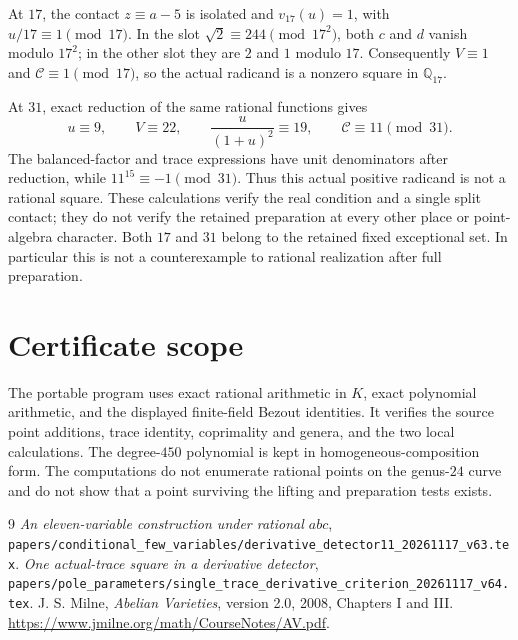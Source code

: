 \documentclass[11pt,a4paper]{article}
\newcommand{\Q}{\mathbb Q}
\begin{document}
At $17$, the contact $z\equiv a-5$ is isolated and
$v_{17}(u)=1$, with $u/17\equiv1\pmod{17}$. In the slot
$\sqrt2\equiv244\pmod{17^2}$, both $c$ and $d$ vanish modulo
$17^2$; in the other slot they are $2$ and $1$ modulo $17$.
Consequently $V\equiv1$ and $\mathcal C\equiv1\pmod{17}$,
so the actual radicand is a nonzero square in $\Q_{17}$.

At $31$, exact reduction of the same rational functions gives
\[
       u\equiv9,\qquad V\equiv22,\qquad
       \frac{u}{(1+u)^2}\equiv19,\qquad
                       \mathcal C\equiv11\pmod{31}.
\]
The balanced-factor and trace expressions have unit denominators
after reduction, while $11^{15}\equiv-1\pmod{31}$.
Thus this actual positive radicand is not a rational square. These
calculations verify the real condition and a single split contact;
they do not verify the retained preparation at every other place or
point-algebra character. Both $17$ and $31$ belong to the retained
fixed exceptional set. In particular this is not a counterexample
to rational realization after full preparation.

\section{Certificate scope}

The portable program uses exact rational arithmetic in $K$, exact
polynomial arithmetic, and the displayed finite-field Bezout
identities. It verifies the source point additions, trace identity,
coprimality and genera, and the two local calculations. The degree-$450$
polynomial is kept in homogeneous-composition form. The computations
do not enumerate rational points on the genus-$24$ curve and do not
show that a point surviving the lifting and preparation tests exists.

\begin{thebibliography}{9}
\emph{An eleven-variable construction under rational $abc$},
\nolinkurl{papers/conditional_few_variables/derivative_detector11_20261117_v63.tex}.
\emph{One actual-trace square in a derivative detector},
\nolinkurl{papers/pole_parameters/single_trace_derivative_criterion_20261117_v64.tex}.
J. S. Milne, \emph{Abelian Varieties}, version 2.0,
2008, Chapters I and III. \url{https://www.jmilne.org/math/CourseNotes/AV.pdf}.
\end{thebibliography}
\end{document}

